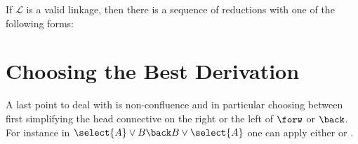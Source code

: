 \begin{theorem}[Productivity]
If $\mathcal{L}$ is a valid linkage, then there
is a sequence of reductions with one of the following forms:
\end{theorem}




\section{Choosing the Best Derivation}

A last point to deal with is non-confluence and in particular choosing
between first simplifying the head connective on the right or the left
of $\forw$ or $\back$. For instance in
$\select{A}\lor B \back B\lor\select{A}$ one can apply either
 or .

